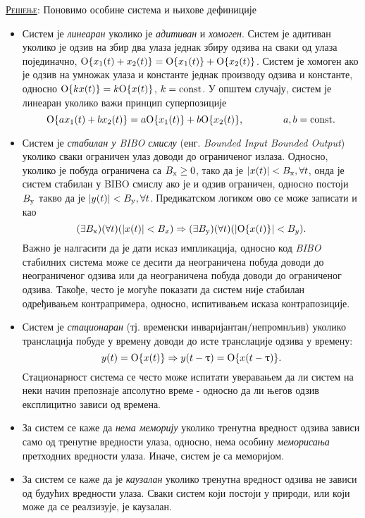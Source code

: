 \textsc{\underline{Решење}}:
Поновимо особине система и њихове дефиниције
\begin{itemize}
    \item Систем је \textit{линеаран} уколико је \textit{адитиван} и \textit{хомоген}. Систем је адитиван уколико је 
    одзив на збир два улаза једнак збиру одзива на сваки од улаза појединачно, 
    ${{\rm O}\{x_1(t) + x_2(t)\} = {\rm O}\{x_1(t)\} + {\rm O}\{x_2(t)\}}$.
    Систем је хомоген ако је
    одзив на умножак улаза и константе једнак производу одзива и константе, односно
    ${\rm O}\{kx(t)\} = k {\rm O}\{x(t)\}$, $k = \rm const$. У општем случају, систем је линеаран уколико важи принцип 
    суперпозиције 
    \begin{equation}
        {{\rm O}\{ax_1(t) + bx_2(t)\} = a{\rm O}\{x_1(t)\} + b{\rm O}\{x_2(t)\}}, \qquad \qquad a,b = \rm const.
    \end{equation}
    \item Систем је \textit{стабилан у \textit{BIBO} смислу} (енг. \textit{Bounded Input Bounded Output}) 
    уколико сваки ограничен улаз доводи до ограниченог излаза. Односно, уколико је побуда ограничена са $B_{\rm x} \geq 0$,
    тако да је $|x(t)| < B_{\rm x}, \forall t$, онда је систем стабилан у BIBO смислу ако је и одзив ограничен, 
    односно постоји $B_{\rm y}$ такво да је $|y(t)| < B_{\rm y}, \forall t$. Предикатском логиком ово се може записати 
    и као 
    \begin{equation}
        (\exists B_{\rm x})(\forall t)( |x(t)| < B_x ) \Rightarrow
        (\exists B_{\rm y})(\forall t)( |{\rm O}\{x(t)\}| < B_y ).
    \end{equation}
    Важно је налгасити да је дати исказ импликација,
    односно код \textit{BIBO} стабилних система може се десити да неограничена побуда доводи до неограниченог одзива 
    или да неограничена побуда доводи до ограниченог одзива. Такође, често је могуће показати да систем није стабилан 
    одређивањем контрапримера, односно, испитивањем исказа контрапозиције.

    \item Систем је \textit{стационаран} (тј. временски инваријантан/непромнљив) уколико транслација побуде у времену 
    доводи до исте транслације одзива у времену: 
    \begin{equation}
        {y(t) = {\rm O}\{x(t)\} \Rightarrow y(t - \uptau) = {\rm O}\{x(t - \uptau)\}}.
    \end{equation}
    Стационарност система се често може испитати уверавањем да ли систем на неки начин препознаје апсолутно време - односно 
    да ли његов одзив експлицитно зависи од времена.
    \item За систем се каже да \textit{нема меморију} уколико тренутна вредност одзива зависи само од тренутне вредности улаза, односно, нема 
    особину \textit{меморисања} претходних вредности улаза. Иначе, систем је са меморијом. 

    \item За систем се каже да је  \textit{каузалан} уколико тренутна вредност одзива не зависи од будућих вредности улаза. 
    Сваки систем који постоји у природи, или који може да се реалзизује, је каузалан.
\end{itemize}

